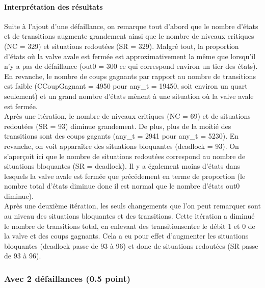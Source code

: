 \documentclass[a4paper]{book}
\begin{document}
\paragraph{Interprétation des résultats}
Suite à l'ajout d'une défaillance, on remarque tout d'abord que le nombre d'états et de transitions augmente grandement ainsi que le nombre 
de niveaux critiques (NC = 329) et situations redoutées (SR = 329). Malgré tout, la proportion d'états où la valve avale est fermée est approximativement 
la même que lorsqu'il n'y a pas de défaillance (out0 = 300 ce qui correspond environ un tier des états). En revanche, le nombre de coups gagnants par rapport 
au nombre de transitions est faible (CCoupGagnant = 4950 pour any\_t = 19450, soit environ un quart seulement) et un grand nombre d'états mènent à une situation où 
la valve avale est fermée. \\
Après une itération, le nombre de niveaux critiques (NC = 69) et de situations redoutées (SR = 93) diminue grandement. De plus, plus de la moitié des transitions 
sont des coups gagants (any\_t = 2941 pour any\_t = 5230). En revanche, on voit apparaître des situations bloquantes (deadlock = 93). On s'aperçoit ici que le nombre 
de situations redoutées correspond au nombre de situations bloquantes (SR = deadlock). Il y a également moins 
d'états dans lesquels la valve avale est fermée que précédement en terme de proportion (le nombre total d'états diminue donc il est normal que le nombre d'états out0 
diminue).\\
Après une deuxième itération, les seuls changements que l'on peut remarquer sont au niveau des situations bloquantes et des transitions. Cette itération a diminué 
le nombre de transitions total, en enlevant des transitionsentre le débit 1 et 0 de la valve et des coups gagnants. Cela a eu pour  
effet d'augmenter les situations bloquantes (deadlock passe de 93 à 96) et donc de situations redoutées (SR passe de 93 à 96).



\subsubsection{Avec 2 défaillances (0.5 point)}





\end{document}
